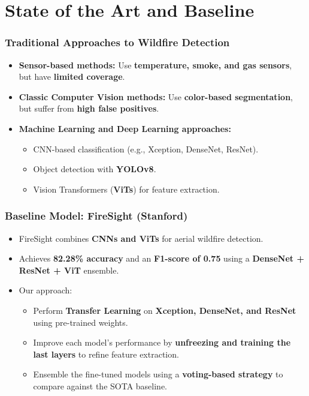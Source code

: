 \section{State of the Art and Baseline}
\label{sec:baseline}

\begin{frame}
    \frametitle{Traditional Approaches to Wildfire Detection}
    \begin{itemize}
        \item \textbf{Sensor-based methods:} Use \textbf{temperature, smoke, and gas sensors}, but have \textbf{limited coverage}.
        \item \textbf{Classic Computer Vision methods:} Use \textbf{color-based segmentation}, but suffer from \textbf{high false positives}.
        \item \textbf{Machine Learning and Deep Learning approaches:}
            \begin{itemize}
                \item CNN-based classification (e.g., Xception, DenseNet, ResNet).
                \item Object detection with \textbf{YOLOv8}.
                \item Vision Transformers (\textbf{ViTs}) for feature extraction.
            \end{itemize}
    \end{itemize}
\end{frame}

\begin{frame}
    \frametitle{Baseline Model: FireSight (Stanford)}
    \begin{itemize}
        \item FireSight combines \textbf{CNNs and ViTs} for aerial wildfire detection.
        \item Achieves \textbf{82.28\% accuracy} and an \textbf{F1-score of 0.75} using a \textbf{DenseNet + ResNet + ViT} ensemble.
        \item Our approach:
            \begin{itemize}
                \item Perform \textbf{Transfer Learning} on \textbf{Xception, DenseNet, and ResNet} using pre-trained weights.
                \item Improve each model's performance by \textbf{unfreezing and training the last layers} to refine feature extraction.
                \item Ensemble the fine-tuned models using a \textbf{voting-based strategy} to compare against the SOTA baseline.
            \end{itemize}
    \end{itemize}
\end{frame}